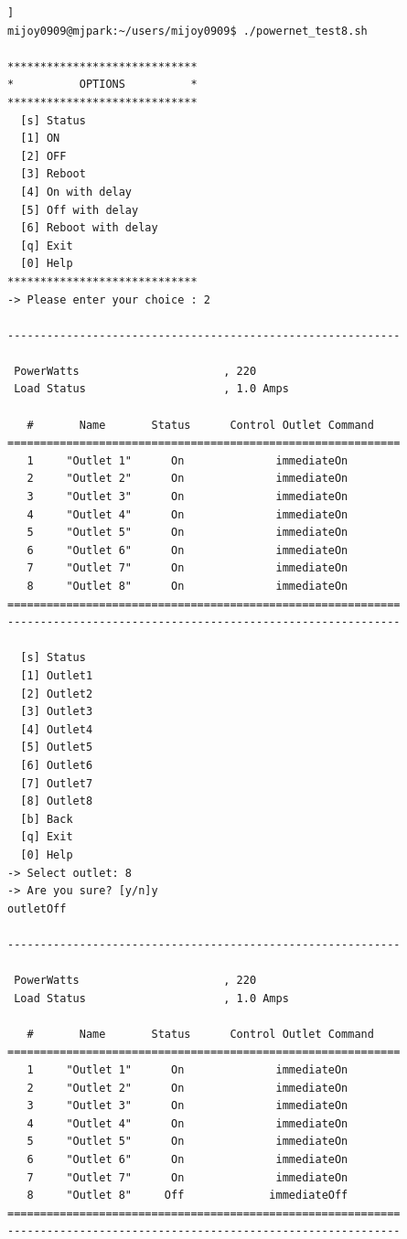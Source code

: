 \documentclass[11pt
  , a4paper
  , article
  , oneside
]{memoir}
\begin{document}
\begin{lstlisting}[style=termstyle, caption=APC PDU 모니터링 및 제어결과]]
mijoy0909@mjpark:~/users/mijoy0909$ ./powernet_test8.sh

*****************************
*          OPTIONS          *
*****************************
  [s] Status                 
  [1] ON                     
  [2] OFF                    
  [3] Reboot                 
  [4] On with delay          
  [5] Off with delay         
  [6] Reboot with delay      
  [q] Exit                   
  [0] Help                   
*****************************
-> Please enter your choice : 2

------------------------------------------------------------

 PowerWatts                      , 220
 Load Status                     , 1.0 Amps

   #       Name       Status      Control Outlet Command
============================================================
   1     "Outlet 1"      On              immediateOn
   2     "Outlet 2"      On              immediateOn
   3     "Outlet 3"      On              immediateOn
   4     "Outlet 4"      On              immediateOn
   5     "Outlet 5"      On              immediateOn
   6     "Outlet 6"      On              immediateOn
   7     "Outlet 7"      On              immediateOn
   8     "Outlet 8"      On              immediateOn
============================================================
------------------------------------------------------------

  [s] Status                 
  [1] Outlet1                
  [2] Outlet2                
  [3] Outlet3                
  [4] Outlet4                
  [5] Outlet5                
  [6] Outlet6                
  [7] Outlet7                
  [8] Outlet8                
  [b] Back                   
  [q] Exit                   
  [0] Help                   
-> Select outlet: 8
-> Are you sure? [y/n]y
outletOff

------------------------------------------------------------

 PowerWatts                      , 220
 Load Status                     , 1.0 Amps

   #       Name       Status      Control Outlet Command
============================================================
   1     "Outlet 1"      On              immediateOn
   2     "Outlet 2"      On              immediateOn
   3     "Outlet 3"      On              immediateOn
   4     "Outlet 4"      On              immediateOn
   5     "Outlet 5"      On              immediateOn
   6     "Outlet 6"      On              immediateOn
   7     "Outlet 7"      On              immediateOn
   8     "Outlet 8"     Off             immediateOff
============================================================
------------------------------------------------------------
\end{lstlisting}
\end{document}
